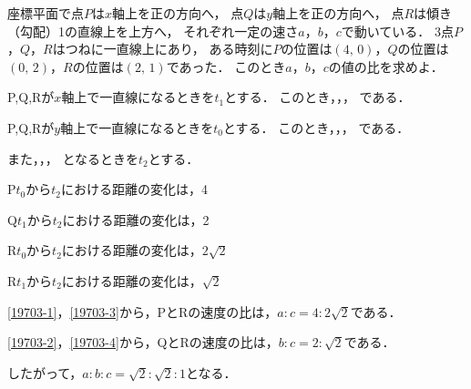 \begin{problem}
座標平面で点$P$は$x$軸上を正の方向へ，
点$Q$は$y$軸上を正の方向へ，
点$R$は傾き（勾配）1の直線上を上方へ，
それぞれ一定の速さ$a$，$b$，$c$で動いている．
3点$P$，$Q$，$R$はつねに一直線上にあり，
ある時刻に$P$の位置は$(4, \, 0)$，$Q$の位置は$(0, \, 2)$，$R$の位置は$(2, \, 1)$であった．
このとき$a$，$b$，$c$の値の比を求めよ．
\end{problem}

P,Q,Rが$x$軸上で一直線になるときを$t_1$とする．
このとき，，， である．

P,Q,Rが$y$軸上で一直線になるときを$t_0$とする．
このとき，，， である．

また，，， となるときを$t_2$とする．

P\qquad $t_0$から$t_2$における距離の変化は，4\houteisiki{\label{19703-1}}

Q\qquad $t_1$から$t_2$における距離の変化は，2\houteisiki{\label{19703-2}}

R\qquad $t_0$から$t_2$における距離の変化は，$2\sqrt2$\houteisiki{\label{19703-3}}

R\qquad $t_1$から$t_2$における距離の変化は，$\sqrt2$\houteisiki{\label{19703-4}}

\eqref{19703-1}，\eqref{19703-3}から，PとRの速度の比は，$a:c=4:2\sqrt2$である．

\eqref{19703-2}，\eqref{19703-4}から，QとRの速度の比は，$b:c=2:\sqrt2$である．

したがって，$a:b:c=\sqrt2:\sqrt2:1$となる．
